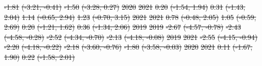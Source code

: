 \documentclass[
  letterpaper,
  DIV=11,
  numbers=noendperiod]{scrartcl}
\providecommand{\DIFdeltex}[1]{{\protect\color{red}\sout{#1}}}                      %
\providecommand{\DIFdelFL}[1]{\DIFdel{#1}} %
\providecommand{\DIFdel}[1]{\texorpdfstring{\DIFdeltex{#1}}{}} %
\begin{document}
\DIFdelFL{-1.81 }%
\DIFdelFL{(-3.21, -0.41) }%
\DIFdelFL{-1.50 }%
\DIFdelFL{(-3.28, 0.27)}%
\DIFdelFL{\hspace{1em}2020 }%
\DIFdelFL{2021 }%
\DIFdelFL{0.20 }%
\DIFdelFL{(-1.54, 1.94) }%
\DIFdelFL{0.31 }%
\DIFdelFL{(-1.43, 2.04) }%
\DIFdelFL{1.14 }%
\DIFdelFL{(-0.65, 2.94) }%
\DIFdelFL{1.23 }%
\DIFdelFL{(-0.70, 3.15)}%
\DIFdelFL{\hspace{1em}2021 }%
\DIFdelFL{2021 }%
\DIFdelFL{0.78 }%
\DIFdelFL{(-0.48, 2.05) }%
\DIFdelFL{1.05 }%
\DIFdelFL{(-0.59, 2.69) }%
\DIFdelFL{0.20 }%
\DIFdelFL{(-1.21, 1.62) }%
\DIFdelFL{0.36 }%
\DIFdelFL{(-1.34, 2.06)}%
\DIFdelFL{\hspace{1em}2019 }%
\DIFdelFL{2019 }%
\DIFdelFL{-2.67 }%
\DIFdelFL{(-4.57, -0.78) }%
\DIFdelFL{-2.43 }%
\DIFdelFL{(-4.58, -0.28) }%
\DIFdelFL{-2.52 }%
\DIFdelFL{(-4.34, -0.70) }%
\DIFdelFL{-2.13 }%
\DIFdelFL{(-4.18, -0.08)}%
\DIFdelFL{\hspace{1em}2019 }%
\DIFdelFL{2021 }%
\DIFdelFL{-2.55 }%
\DIFdelFL{(-4.15, -0.94) }%
\DIFdelFL{-2.20 }%
\DIFdelFL{(-4.18, -0.22) }%
\DIFdelFL{-2.18 }%
\DIFdelFL{(-3.60, -0.76) }%
\DIFdelFL{-1.80 }%
\DIFdelFL{(-3.58, -0.03)}%
\DIFdelFL{\hspace{1em}2020 }%
\DIFdelFL{2021 }%
\DIFdelFL{0.11 }%
\DIFdelFL{(-1.67, 1.90) }%
\DIFdelFL{0.22 }%
\DIFdelFL{(-1.58, 2.01) }%
\end{document}
